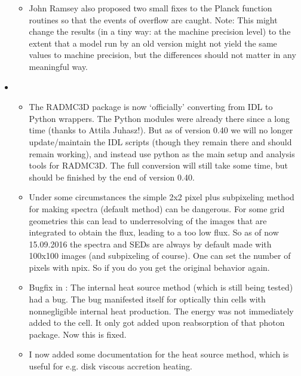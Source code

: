 \documentclass[letterpaper,10pt,english]{sphinxmanual}
\begin{document}
\begin{itemize}
\begin{itemize}
\item {} 
John Ramsey also proposed two small fixes to the Planck function
routines so that the events of overflow are caught. Note: This might
change the results (in a tiny way: at the machine precision level) to
the extent that a model run by an old version might not yield the same
values to machine precision, but the differences should not matter in
any meaningful way.

\end{itemize}

\item {} 
\begin{itemize}
\item {} 
The RADMC\sphinxhyphen{}3D package is now ‘officially’ converting from IDL to
Python wrappers. The Python modules were already there since a long time
(thanks to Attila Juhasz!). But as of version 0.40 we will no longer
update/maintain the IDL scripts (though they remain there and should
remain working), and instead use python as the main setup and analysis
tools for RADMC\sphinxhyphen{}3D. The full conversion will still take some time, but
should be finished by the end of version 0.40.

\item {} 
Under some circumstances the simple 2x2 pixel plus sub\sphinxhyphen{}pixeling
method for making spectra (default method) can be dangerous. For some
grid geometries this can lead to under\sphinxhyphen{}resolving of the images that are
integrated to obtain the flux, leading to a too low flux.  So as of now
15.09.2016 the spectra and SEDs are always by default made with 100x100
images (and sub\sphinxhyphen{}pixeling of course). One can set the number of pixels
with npix. So if you do  you get
the original behavior again.

\item {} 
Bugfix in :
The internal heat source method (which is still being tested)
had a bug. The bug manifested itself for optically thin cells with
non\sphinxhyphen{}negligible internal heat production. The energy was not immediately
added to the cell. It only got added upon re\sphinxhyphen{}absorption of that photon
package. Now this is fixed.

\item {} 
I now added some documentation for the heat source method, which
is useful for e.g. disk viscous accretion heating.


\end{itemize}
\end{itemize}
\end{document}
